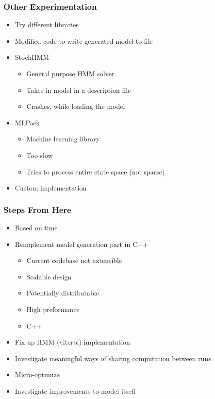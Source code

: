 \documentclass{beamer}
\begin{document}
\begin{frame}[fragile]
\frametitle{Other Experimentation}
\begin{itemize}
 \item Try different libraries
 \item Modified code to write generated model to file
 \item StochHMM
 \begin{itemize}
  \item General purpose HMM solver
  \item Takes in model in a description file
  \item Crashes, while loading the model
 \end{itemize}
 \item MLPack
 \begin{itemize}
  \item Machine learning library
  \item Too slow
  \item Tries to process entire state space (not sparse)
 \end{itemize}
 \item Custom implementation
\end{itemize}
\end{frame}


\begin{frame}
\frametitle{Steps From Here}
\begin{itemize}
 \item Based on time
 \item Reimplement model generation part in C++
 \begin{itemize}
  \item Current codebase not extensible
  \item Scalable design
  \item Potentially distributable
  \item High preformance
  \item C++
 \end{itemize}
 \item Fix up HMM (viterbi) implementation
 \item Investigate meaningful ways of sharing computation between runs
 \item Micro-optimize
 \item Investigate improvements to model itself
\end{itemize}

\end{frame}
\end{document}
